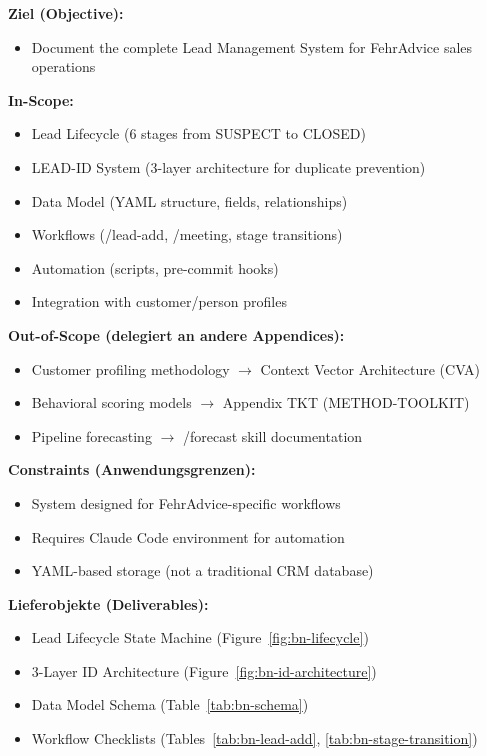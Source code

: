\begin{tcolorbox}[
    colback=orange!5!white,
    colframe=orange!75!black,
    title={\textbf{Appendix Scope: Ziel / In-Scope / Out-of-Scope / Constraints}},
    fonttitle=\bfseries
]

\textbf{Ziel (Objective):}
\begin{itemize}[nosep]
    \item Document the complete Lead Management System for FehrAdvice sales operations
\end{itemize}

\textbf{In-Scope:}
\begin{itemize}[nosep]
    \item Lead Lifecycle (6 stages from SUSPECT to CLOSED)
    \item LEAD-ID System (3-layer architecture for duplicate prevention)
    \item Data Model (YAML structure, fields, relationships)
    \item Workflows (/lead-add, /meeting, stage transitions)
    \item Automation (scripts, pre-commit hooks)
    \item Integration with customer/person profiles
\end{itemize}

\textbf{Out-of-Scope (delegiert an andere Appendices):}
\begin{itemize}[nosep]
    \item Customer profiling methodology $\rightarrow$ Context Vector Architecture (CVA)
    \item Behavioral scoring models $\rightarrow$ Appendix TKT (METHOD-TOOLKIT)
    \item Pipeline forecasting $\rightarrow$ /forecast skill documentation
\end{itemize}

\textbf{Constraints (Anwendungsgrenzen):}
\begin{itemize}[nosep]
    \item System designed for FehrAdvice-specific workflows
    \item Requires Claude Code environment for automation
    \item YAML-based storage (not a traditional CRM database)
\end{itemize}

\textbf{Lieferobjekte (Deliverables):}
\begin{itemize}[nosep]
    \item Lead Lifecycle State Machine (Figure~\ref{fig:bn-lifecycle})
    \item 3-Layer ID Architecture (Figure~\ref{fig:bn-id-architecture})
    \item Data Model Schema (Table~\ref{tab:bn-schema})
    \item Workflow Checklists (Tables~\ref{tab:bn-lead-add}, \ref{tab:bn-stage-transition})
\end{itemize}

\end{tcolorbox}


